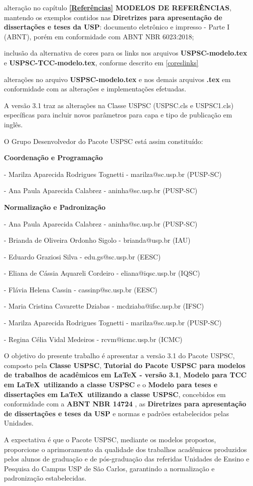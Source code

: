 \begin{alineas}
	\item alteração no capítulo \textbf{\ref{Referências} MODELOS DE REFERÊNCIAS}, mantendo os exemplos contidos nas \textbf{Diretrizes para apresentação de dissertações e teses da USP}: documento eletrônico e impresso - Parte I (ABNT), porém em conformidade com ABNT NBR 6023:2018; 
	\item inclusão da alternativa de cores para os links nos arquivos \textbf{USPSC-modelo.tex} e \textbf{USPSC-TCC-modelo.tex}, conforme descrito em \ref{coreslinks} 
	\item alterações no arquivo \textbf{USPSC-modelo.tex} e nos demais arquivos \textbf{.tex} em conformidade com as alterações e implementações efetuadas.	\\
\end{alineas}

	A versão 3.1 traz as alterações na Classe USPSC (USPSC.cls e USPSC1.cls) específicas para incluir novos parâmetros para capa e tipo de publicação em inglês.

	O Grupo Desenvolvedor do Pacote USPSC está assim constituído:

\textbf{Coordenação e Programação}

- Marilza Aparecida Rodrigues Tognetti - marilza@sc.usp.br (PUSP-SC)	

- Ana Paula Aparecida Calabrez - aninha@sc.usp.br (PUSP-SC) 

\textbf{Normalização e Padronização}

- Ana Paula Aparecida Calabrez - aninha@sc.usp.br (PUSP-SC)

- Brianda de Oliveira Ordonho Sigolo - brianda@usp.br (IAU)

- Eduardo Graziosi Silva - edu.gs@sc.usp.br (EESC)

- Eliana de Cássia Aquareli Cordeiro - eliana@iqsc.usp.br (IQSC)

- Flávia Helena Cassin - cassinp@sc.usp.br (EESC)	

- Maria Cristina Cavarette Dziabas - mcdziaba@ifsc.usp.br (IFSC)	

- Marilza Aparecida Rodrigues Tognetti - marilza@sc.usp.br (PUSP-SC)

- Regina Célia Vidal Medeiros - rcvm@icmc.usp.br (ICMC)

	O objetivo do presente trabalho é apresentar a versão 3.1 do Pacote USPSC, composto pela \textbf{Classe USPSC}, \textbf{Tutorial do Pacote USPSC para modelos de trabalhos de acad\^emicos em LaTeX - vers\~ao 3.1},  \textbf{Modelo para TCC em \LaTeX\ utilizando a classe USPSC} e o \textbf{Modelo para teses e dissertações em \LaTeX\ utilizando a classe USPSC}, concebidos em conformidade com a \textbf{ABNT NBR 14724} \cite{nbr14724}, as \textbf{Diretrizes para apresentação de dissertações e teses da USP} \cite{aguia2020} e normas e padrões estabelecidos pelas Unidades. 
	
	A expectativa é que o Pacote USPSC, mediante os modelos propostos, proporcione o aprimoramento da qualidade dos trabalhos acadêmicos produzidos pelos alunos de graduação e de pós-graduação das referidas Unidades de Ensino e Pesquisa do Campus USP de São Carlos, garantindo a normalização e padronização estabelecidas.
	
	
